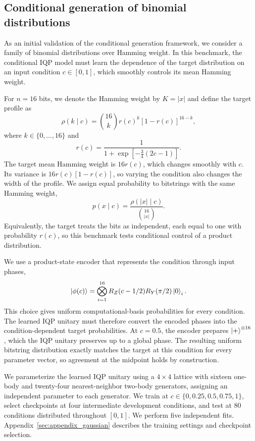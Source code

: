 \documentclass[pra,aps,10pt,twocolumn,floatfix,superscriptaddress, notitlepage,longbibliography]{revtex4-2}
\begin{document}
\subsection{Conditional generation of binomial distributions}

As an initial validation of the conditional generation framework, we consider a family of binomial distributions over Hamming weight. In this benchmark, the conditional IQP model must learn the dependence of the target distribution on an input condition $c\in[0,1]$, which smoothly controls its mean Hamming weight.

For $n=16$ bits, we denote the Hamming weight by $K=|x|$ and define the target profile as
\begin{equation}
    \rho(k\mid c)
    =\binom{16}{k}r(c)^k[1-r(c)]^{16-k},
    \label{eq:gaussian-translation-target}
\end{equation}
where $k\in\{0,\ldots,16\}$ and
\begin{equation}
    r(c)=\frac{1}{1+\exp[-\tfrac34(2c-1)]}.
\end{equation}
The target mean Hamming weight is $16r(c)$, which changes smoothly with $c$. Its variance is $16r(c)[1-r(c)]$, so varying the condition also changes the width of the profile. We assign equal probability to bitstrings with the same Hamming weight,
\begin{equation}
    p(x\mid c)
    =\frac{\rho(|x|\mid c)}{\binom{16}{|x|}}.
\end{equation}
Equivalently, the target treats the bits as independent, each equal to one with probability $r(c)$, so this benchmark tests conditional control of a product distribution.

We use a product-state encoder that represents the condition through input phases,
\begin{equation}
    \ket{\phi(c)}
    =\bigotimes_{i=1}^{16}
    R_Z(c-1/2)R_Y(\pi/2)\ket{0}_i.
\end{equation}
This choice gives uniform computational-basis probabilities for every condition. The learned IQP unitary must therefore convert the encoded phases into the condition-dependent target probabilities. At $c=0.5$, the encoder prepares $\ket{+}^{\otimes16}$, which the IQP unitary preserves up to a global phase. The resulting uniform bitstring distribution exactly matches the target at this condition for every parameter vector, so agreement at the midpoint holds by construction.

We parameterize the learned IQP unitary using a $4\times4$ lattice with sixteen one-body and twenty-four nearest-neighbor two-body generators, assigning an independent parameter to each generator. We train at $c\in\{0,0.25,0.5,0.75,1\}$, select checkpoints at four intermediate development conditions, and test at $80$ conditions distributed throughout $[0,1]$. We perform five independent fits. Appendix~\ref{sec:appendix_gaussian} describes the training settings and checkpoint selection.
\end{document}
